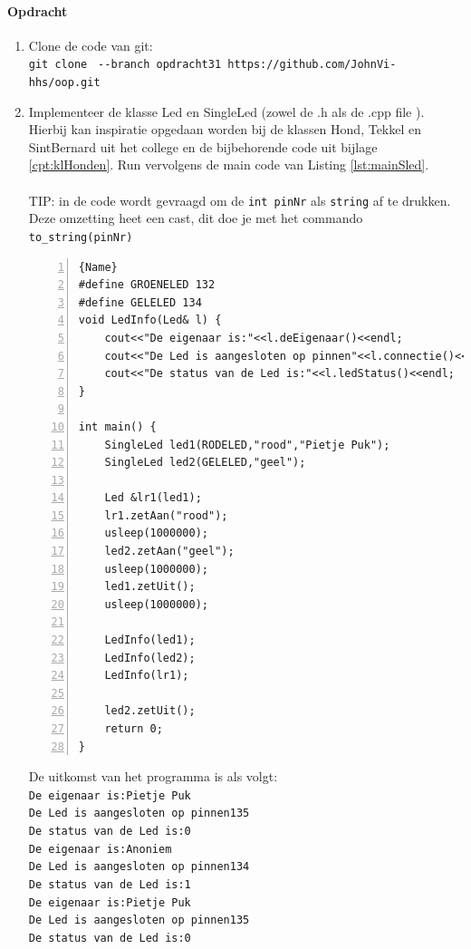 \paragraph{Opdracht} 
\begin{enumerate}[label=(\alph*)]
\item Clone de code van git: \\
{\small \texttt{git clone } \verb|--|\texttt{branch opdracht31 https://github.com/JohnVi-hhs/oop.git}}
\item
Implementeer de klasse Led en SingleLed (zowel de .h als de .cpp file ).
Hierbij kan inspiratie opgedaan worden bij de klassen Hond, Tekkel en SintBernard uit het college en de bijbehorende code uit bijlage \ref{cpt:klHonden}. Run vervolgens de main code van Listing \ref{lst:mainSled}.\\~\\
TIP: in de code wordt gevraagd om de \texttt{int pinNr} als \texttt{string} af te drukken. Deze omzetting heet een cast, dit doe je met het commando \texttt{to\_string(pinNr)}
\newpage

\begin{lstlisting}[caption=main functie om de klasse SingleLed te testen. ,frame=trbl,firstnumber=1,numbers=left,label={lst:mainSled}]{Name}
#define GROENELED 132
#define GELELED 134
void LedInfo(Led& l) {
	cout<<"De eigenaar is:"<<l.deEigenaar()<<endl;
	cout<<"De Led is aangesloten op pinnen"<<l.connectie()<<endl;
	cout<<"De status van de Led is:"<<l.ledStatus()<<endl;
}

int main() {
	SingleLed led1(RODELED,"rood","Pietje Puk");
	SingleLed led2(GELELED,"geel");
	
	Led &lr1(led1);
	lr1.zetAan("rood");
	usleep(1000000);
	led2.zetAan("geel"); 
	usleep(1000000);
	led1.zetUit();
	usleep(1000000);
	
	LedInfo(led1);
	LedInfo(led2);
	LedInfo(lr1);
	
	led2.zetUit();
	return 0;
}

\end{lstlisting}

De uitkomst van het programma is als volgt:\\
\texttt{De eigenaar is:Pietje Puk\\
De Led is aangesloten op pinnen135\\
De status van de Led is:0\\
De eigenaar is:Anoniem\\
De Led is aangesloten op pinnen134\\
De status van de Led is:1\\
De eigenaar is:Pietje Puk\\
De Led is aangesloten op pinnen135\\
De status van de Led is:0\\}


\end{enumerate}

